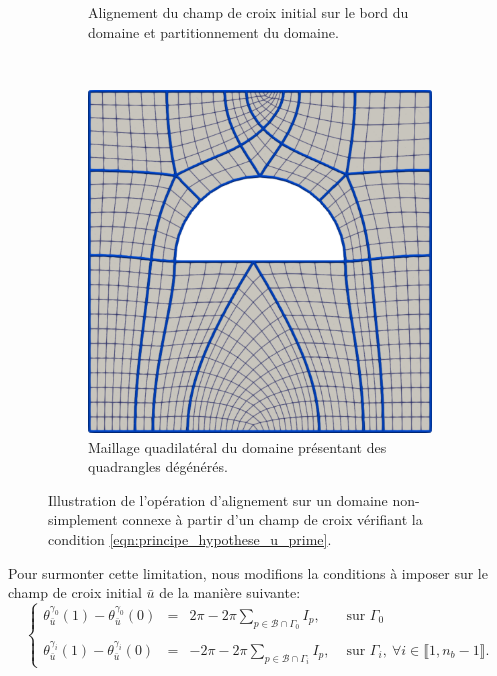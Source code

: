 \begin{figure}[!h]
\begin{subfigure}{0.495\textwidth}
    \caption{Alignement du champ de croix initial sur le bord du domaine et partitionnement du domaine.}
    \label{fig:carre_demi_disc_vide_mauvais_second}
\end{subfigure}
\\[0.2cm]
\begin{subfigure}{0.5\textwidth}
    \includegraphics[width=\textwidth]{images/carre_demi_disc_vide_mauvais_third.pdf}
    \caption{Maillage quadilatéral du domaine présentant des quadrangles dégénérés.}
    \label{fig:carre_demi_disc_vide_mauvais_third}
\end{subfigure}
\caption{Illustration de l'opération d'alignement sur un domaine non-simplement connexe à partir d'un champ de croix vérifiant la condition \eqref{eqn:principe_hypothese_u_prime}.}
\label{fig:carre_demi_disc_vide_mauvais}
\end{figure}
Pour surmonter cette limitation, nous modifions la conditions à imposer sur le champ de croix initial $\bar{u}$ de la manière suivante:
\begin{equation}
    \left\{
    \begin{array}{lcll}
    \theta_{\bar{u}}^{\gamma_0}(1)-\theta_{\bar{u}}^{\gamma_0}(0)&=&2\pi-2\pi\displaystyle\sum_{p\in\mathcal{B}\cap\Gamma_0}I_p,&\mbox{ sur }\Gamma_0\\\\
    \theta_{\bar{u}}^{\gamma_i}(1)-\theta_{\bar{u}}^{\gamma_i}(0)&=&-2\pi-2\pi\displaystyle\sum_{p\in\mathcal{B}\cap\Gamma_i}I_p,&\mbox{ sur }\Gamma_i,~\forall i\in\llbracket 1, n_b-1\rrbracket.
    \end{array}
    \right.
    \label{eqn:principe_hypothese_u_second}
\end{equation}

